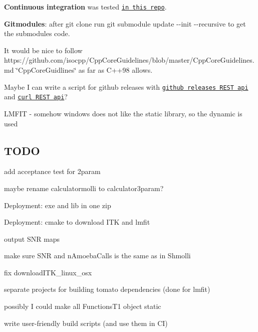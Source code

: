 \begin{DoxyItemize}
\item {\bfseries Continuous integration} was tested \href{https://github.com/MRKonrad/ContinousIntegrationPlayground}{\tt in this repo}.
\item {\bfseries Gitmodules}\-: after {\ttfamily git clone} run {\ttfamily git submodule update -\/-\/init -\/-\/recursive} to get the submodules code.
\item It would be nice to follow https\-://github.com/isocpp/\-Cpp\-Core\-Guidelines/blob/master/\-Cpp\-Core\-Guidelines.\-md \char`\"{}\-Cpp\-Core\-Guidlines\char`\"{} as far as C++98 allows.
\item Maybe I can write a script for github releases with \href{https://developer.github.com/v3/repos/releases/#create-a-release}{\tt github releases R\-E\-S\-T api} and \href{http://www.codingpedia.org/ama/how-to-test-a-rest-api-from-command-line-with-curl/#12_HEAD_requests}{\tt curl R\-E\-S\-T api}?
\item L\-M\-F\-I\-T -\/ somehow windows does not like the static library, so the dynamic is used
\end{DoxyItemize}

\subsection*{T\-O\-D\-O}


\begin{DoxyItemize}
\item add acceptance test for 2param
\item maybe rename calculatormolli to calculator3param?
\item Deployment\-: exe and lib in one zip
\item Deployment\-: cmake to download I\-T\-K and lmfit
\item output S\-N\-R maps
\item make sure S\-N\-R and n\-Amoeba\-Calls is the same as in Shmolli
\item fix download\-I\-T\-K\-\_\-linux\-\_\-osx
\item separate projects for building tomato dependencies (done for lmfit)
\item possibly I could make all Functions\-T1 object static
\item write user-\/friendly build scripts (and use them in C\-I) 
\end{DoxyItemize}